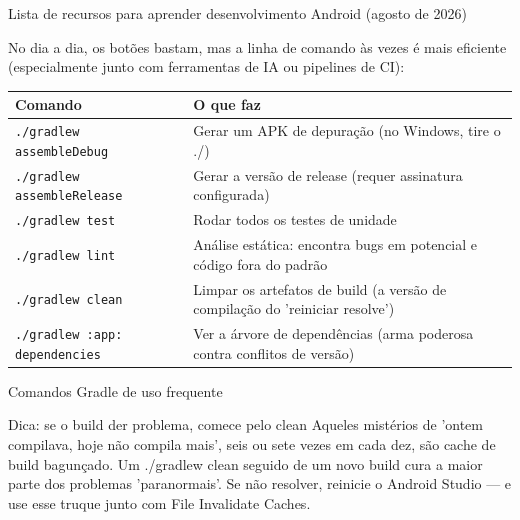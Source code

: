 \begin{center}\small\color{gray}Lista de recursos para aprender desenvolvimento Android (agosto de 2026)\end{center}


No dia a dia, os botões bastam, mas a linha de comando às vezes é mais eficiente (especialmente junto com ferramentas de IA ou pipelines de CI):

\begin{center}
\begin{tabularx}{\linewidth}{|X|X|}
\hline
\textbf{Comando} & \textbf{O que faz} \tabularnewline
\hline
\texttt{.\allowbreak /\allowbreak gradlew assembleDebug} & Gerar um APK de depuração (no Windows, tire o ./) \tabularnewline
\texttt{.\allowbreak /\allowbreak gradlew assembleRelease} & Gerar a versão de release (requer assinatura configurada) \tabularnewline
\texttt{.\allowbreak /\allowbreak gradlew test} & Rodar todos os testes de unidade \tabularnewline
\texttt{.\allowbreak /\allowbreak gradlew lint} & Análise estática: encontra bugs em potencial e código fora do padrão \tabularnewline
\texttt{.\allowbreak /\allowbreak gradlew clean} & Limpar os artefatos de build (a versão de compilação do 'reiniciar resolve') \tabularnewline
\texttt{.\allowbreak /\allowbreak gradlew :app: dependencies} & Ver a árvore de dependências (arma poderosa contra conflitos de versão) \tabularnewline
\hline
\end{tabularx}
\end{center}

\begin{center}\small\color{gray}Comandos Gradle de uso frequente\end{center}

\begin{tcbinfo}{Dica: se o build der problema, comece pelo clean}
Aqueles mistérios de 'ontem compilava, hoje não compila mais', seis ou sete vezes em cada dez, são cache de build bagunçado. Um ./gradlew clean seguido de um novo build cura a maior parte dos problemas 'paranormais'. Se não resolver, reinicie o Android Studio — e use esse truque junto com File Invalidate Caches.

\end{tcbinfo}



